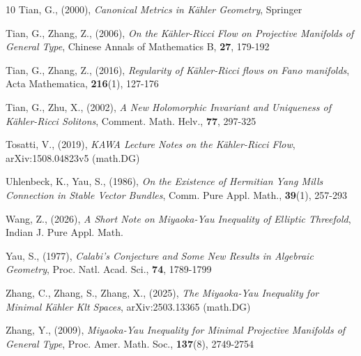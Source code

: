 \documentclass[12pt]{article}
\numberwithin{equation}{section}
\begin{document}
\begin{thebibliography}{10}
 Tian, G., (2000), 
\textit{Canonical Metrics in K\"ahler Geometry}, 
Springer

 Tian, G., Zhang, Z., (2006), 
\textit{On the K\"ahler-Ricci Flow on Projective Manifolds of General Type}, 
Chinese Annals of Mathematics B, 
\textbf{27}, 179-192

 Tian, G., Zhang, Z., (2016), 
\textit{Regularity of K\"ahler-Ricci flows on Fano manifolds}, 
Acta Mathematica, \textbf{216}(1), 127-176

 Tian, G., Zhu, X., (2002),
\textit{A New Holomorphic Invariant and Uniqueness of K\"ahler-Ricci Solitons}, 
Comment. Math. Helv., \textbf{77}, 297-325

 Tosatti, V., (2019), 
\textit{KAWA Lecture Notes on the K\"ahler-Ricci Flow}, 
arXiv:1508.04823v5 (math.DG)

 Uhlenbeck, K., Yau, S., (1986), 
\textit{On the Existence of Hermitian Yang Mills Connection in Stable Vector Bundles}, Comm. Pure Appl. Math., \textbf{39}(1), 257-293

 Wang, Z., (2026),
\textit{A Short Note on Miyaoka-Yau Inequality of Elliptic Threefold},
Indian J. Pure Appl. Math.

 Yau, S., (1977),
\textit{Calabi's Conjecture and Some New Results in Algebraic Geometry},
Proc. Natl. Acad. Sci., \textbf{74}, 1789-1799

 Zhang, C., Zhang, S., Zhang, X., (2025),
\textit{The Miyaoka-Yau Inequality for Minimal
K\"ahler Klt Spaces},
arXiv:2503.13365 (math.DG)

 Zhang, Y., (2009),
\textit{Miyaoka-Yau Inequality for Minimal Projective Manifolds of General Type},
Proc. Amer. Math. Soc., \textbf{137}(8), 2749-2754

\end{thebibliography}
\end{document}
